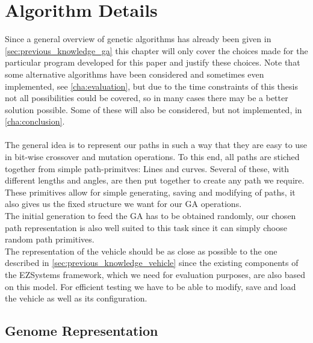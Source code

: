 \chapter{Algorithm Details}
\label{cha:algorithm_details}

Since a general overview of genetic algorithms has already been given in \ref{sec:previous_knowledge_ga} this chapter will only cover the choices made for the particular program developed for this paper and justify these choices. Note that some alternative algorithms have been considered and sometimes even implemented, see \ref{cha:evaluation}, but due to the time constraints of this thesis not all possibilities could be covered, so in many cases there may be a better solution possible. Some of these will also be considered, but not implemented, in \ref{cha:conclusion}. \\
\\
The general idea is to represent our paths in such a way that they are easy to use in bit-wise crossover and mutation operations. To this end, all paths are stiched together from simple path-primitves: Lines and curves. Several of these, with different lengths and angles, are then put together to create any path we require. These primitives allow for simple generating, saving and modifying of paths, it also gives us the fixed structure we want for our GA operations.\\
The initial generation to feed the GA has to be obtained randomly, our chosen path representation is also well suited to this task since it can simply choose random path primitives.\\
The representation of the vehicle should be as close as possible to the one described in \ref{sec:previous_knowledge_vehicle} since the existing components of the EZSystems framework, which we need for evaluation purposes, are also based on this model. For efficient testing we have to be able to modify, save and load the vehicle as well as its configuration.\\

\section{Genome Representation}
\label{sec:genome_representation}

